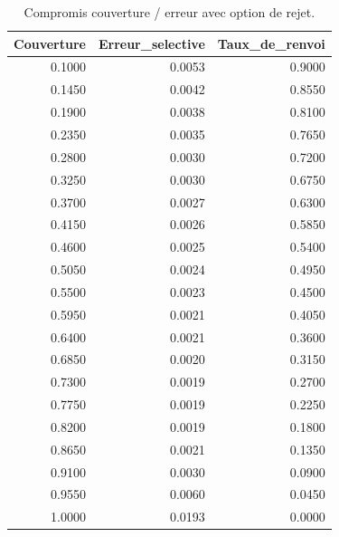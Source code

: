 \begin{table}
\caption{Compromis couverture / erreur avec option de rejet.}
\label{tab:coverage}
\begin{tabular}{rrr}
\toprule
Couverture & Erreur_selective & Taux_de_renvoi \\
\midrule
0.1000 & 0.0053 & 0.9000 \\
0.1450 & 0.0042 & 0.8550 \\
0.1900 & 0.0038 & 0.8100 \\
0.2350 & 0.0035 & 0.7650 \\
0.2800 & 0.0030 & 0.7200 \\
0.3250 & 0.0030 & 0.6750 \\
0.3700 & 0.0027 & 0.6300 \\
0.4150 & 0.0026 & 0.5850 \\
0.4600 & 0.0025 & 0.5400 \\
0.5050 & 0.0024 & 0.4950 \\
0.5500 & 0.0023 & 0.4500 \\
0.5950 & 0.0021 & 0.4050 \\
0.6400 & 0.0021 & 0.3600 \\
0.6850 & 0.0020 & 0.3150 \\
0.7300 & 0.0019 & 0.2700 \\
0.7750 & 0.0019 & 0.2250 \\
0.8200 & 0.0019 & 0.1800 \\
0.8650 & 0.0021 & 0.1350 \\
0.9100 & 0.0030 & 0.0900 \\
0.9550 & 0.0060 & 0.0450 \\
1.0000 & 0.0193 & 0.0000 \\
\bottomrule
\end{tabular}
\end{table}
